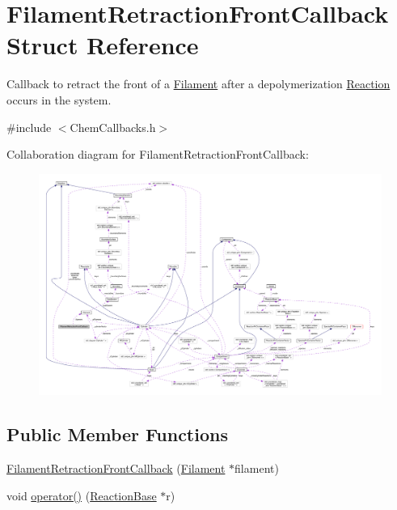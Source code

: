 \hypertarget{structFilamentRetractionFrontCallback}{\section{Filament\+Retraction\+Front\+Callback Struct Reference}
\label{structFilamentRetractionFrontCallback}
}


Callback to retract the front of a \hyperlink{classFilament}{Filament} after a depolymerization \hyperlink{classReaction}{Reaction} occurs in the system.  




{\ttfamily \#include $<$Chem\+Callbacks.\+h$>$}



Collaboration diagram for Filament\+Retraction\+Front\+Callback\+:
\nopagebreak
\begin{figure}[H]
\begin{center}
\leavevmode
\includegraphics[width=350pt]{structFilamentRetractionFrontCallback__coll__graph}
\end{center}
\end{figure}
\subsection*{Public Member Functions}
\begin{DoxyCompactItemize}
\item 
\hyperlink{structFilamentRetractionFrontCallback_a0a6819d2d4b8766c242906a731fcc6dc}{Filament\+Retraction\+Front\+Callback} (\hyperlink{classFilament}{Filament} $\ast$filament)
\item 
void \hyperlink{structFilamentRetractionFrontCallback_a5679aab6f183c11ed3ae712fe85929e1}{operator()} (\hyperlink{classReactionBase}{Reaction\+Base} $\ast$r)
\end{DoxyCompactItemize}
